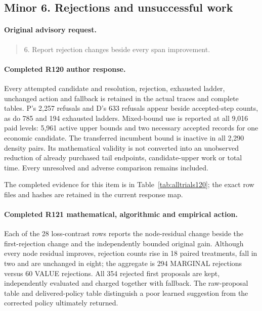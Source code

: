\subsection{Minor 6. Rejections and unsuccessful work}
\label{response121:minor-6}

\paragraph{Original advisory request.}
\begin{quote}
6. Report rejection changes beside every span improvement.
\end{quote}

\paragraph{Completed R120 author response.}
Every attempted candidate and resolution, rejection, exhausted ladder, unchanged action and fallback is retained in the actual traces and complete tables. P's 2,257 refusals and D's 633 refusals appear beside accepted-step counts, as do 785 and 194 exhausted ladders. Mixed-bound use is reported at all 9,016 paid levels: 5,961 active upper bounds and two necessary accepted records for one economic candidate. The transferred incumbent bound is inactive in all 2,290 density pairs. Its mathematical validity is not converted into an unobserved reduction of already purchased tail endpoints, candidate-upper work or total time. Every unresolved and adverse comparison remains included.

The completed evidence for this item is in Table~\ref{tab:alltrials120}; the exact row files and hashes are retained in the current response map.

\paragraph{Completed R121 mathematical, algorithmic and empirical action.}
Each of the 28 loss-contrast rows reports the node-residual change beside the first-rejection change and the independently bounded original gain. Although every node residual improves, rejection counts rise in 18 paired treatments, fall in two and are unchanged in eight; the aggregate is 294 MARGINAL rejections versus 60 VALUE rejections. All 354 rejected first proposals are kept, independently evaluated and charged together with fallback. The raw-proposal table and delivered-policy table distinguish a poor learned suggestion from the corrected policy ultimately returned.

